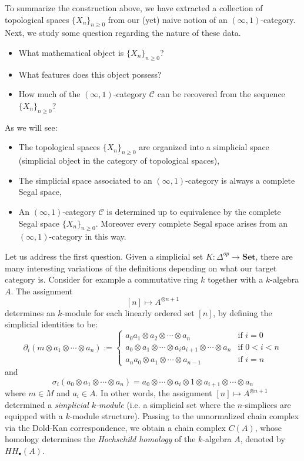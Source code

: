 \documentclass[a4paper,11pt]{article}
\newcommand{\ccal}{\mathcal{C}}
\newcommand{\sets}{\mathbf{Set}}
\theoremstyle{plain}
\theoremstyle{definition}
\theoremstyle{remark}
\begin{document}
To summarize the construction above, we have extracted a collection of topological spaces $\{X_n\}_{n \geq 0}$ from our (yet) naive notion of an $(\infty, 1)$-category. Next, we study some question regarding the nature of these data. 

\begin{itemize}
    \item What mathematical object is $\{X_n\}_{n \geq 0}$?
    \item What features does this object possess?
    \item How much of the $(\infty, 1)$-category $\ccal$ can be recovered from the sequence $\{X_n\}_{n \geq 0}$?
\end{itemize}

As we will see: 

\begin{itemize}
    \item The topological spaces $\{X_n\}_{n \geq 0}$ are organized into a simplicial space (simplicial object in the category of topological spaces),
    \item The simplicial space associated to an $(\infty, 1)$-category is always a complete Segal space,
    \item An $(\infty, 1)$-category $\ccal$ is determined up to equivalence by the complete Segal space $\{X_n\}_{n \geq 0}$. Moreover every complete Segal space arises from an $(\infty, 1)$-category in this way. 
\end{itemize}


Let us address the first question. Given a simplicial set $K \colon \Delta^{op} \to \sets$, there are many interesting variations of the definitions depending on what our target category is. Consider for example a commutative ring $k$ together with a $k$-algebra $A$. The assignment 
$$[n] \mapsto A^{\otimes n+1}$$
determines an $k$-module for each linearly ordered set $[n]$, by defining the simplicial identities to be:
$$\partial_i(m \otimes a_1 \otimes \cdots \otimes a_n) := \begin{cases}
a_0 a_1 \otimes a_2 \otimes \cdots \otimes a_n & \text{if $i = 0$}\\
a_0 \otimes a_1 \otimes \cdots \otimes a_i a_{i+1} \otimes \cdots \otimes a_n & \text{if $0 < i < n$}\\
a_n a_0 \otimes a_1 \otimes \cdots \otimes a_{n-1} & \text{if $i = n$}
\end{cases}$$
and 
$$\sigma_i(a_0 \otimes a_1 \otimes \cdots \otimes a_n) = a_0 \otimes \cdots \otimes a_i \otimes 1 \otimes a_{i+1} \otimes \cdots \otimes a_n$$
where $m \in M$ and $a_i \in A$. In other words, the assignment $[n] \mapsto A^{\otimes n+1}$ determined a \textit{simplicial $k$-module} (i.e. a simplicial set where the $n$-simplices are equipped with a $k$-module structure). Passing to the unnormalized chain complex via the Dold-Kan correspondence, we obtain a chain complex $C(A)$, whose homology determines the \textit{Hochschild homology} of the $k$-algebra $A$, denoted by $HH_{\bullet}(A)$. 
\end{document}

